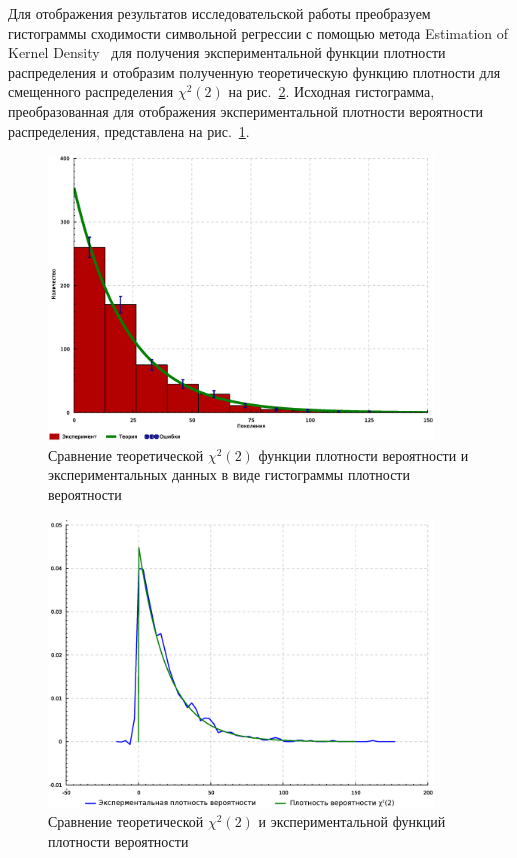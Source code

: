 Для отображения результатов исследовательской работы преобразуем гистограммы сходимости символьной регрессии с помощью метода Estimation of Kernel Density~\cite{KernelDensity} для получения экспериментальной функции плотности распределения и отобразим полученную теоретическую функцию плотности для смещенного распределения $\chi^2(2)$ на рис.~\ref{figure:finalDistr}. Исходная гистограмма, преобразованная для отображения экспериментальной плотности вероятности распределения, представлена на рис.~\ref{figure:finalDistrHistr}.

\begin{figure}[h!]
\centering
\includegraphics[width=0.91\textwidth]{science/final_hist}
\caption{Сравнение теоретической $\chi^2(2)$ функции плотности вероятности и экспериментальных данных в виде гистограммы плотности вероятности}
\label{figure:finalDistrHistr}
\end{figure}

\begin{figure}[h!]
\centering
\includegraphics[width=0.91\textwidth]{science/final}
\caption{Сравнение теоретической $\chi^2(2)$ и экспериментальной функций плотности вероятности}
\label{figure:finalDistr}
\end{figure}